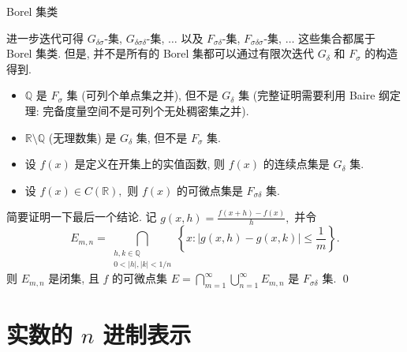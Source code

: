 \begin{frame}{Borel 集类}

进一步迭代可得 $G_{\delta\sigma}$-集, $G_{\delta\sigma\delta}$-集, $\ldots$ 以及 $F_{\sigma\delta}$-集, $F_{\sigma\delta\sigma}$-集, $\ldots$ 这些集合都属于 Borel 集类.
\pause
但是, \alert{并不是所有的 Borel 集都可以通过有限次迭代 $G_\delta$ 和 $F_\sigma$ 的构造得到.}

\pause

\begin{eg}
\begin{itemize}
\item $\mathbb{Q}$ 是 $F_\sigma$ 集 (可列个单点集之并), 但不是 $G_\delta$ 集 (完整证明需要利用 \alert{Baire 纲定理}: 完备度量空间不是可列个无处稠密集之并).
\item $\mathbb{R} \setminus \mathbb{Q}$ (无理数集) 是 $G_\delta$ 集, 但不是 $F_\sigma$ 集.
\item 设 $f(x)$ 是定义在开集上的实值函数, 则 $f(x)$ 的连续点集是 $G_\delta$ 集.
\item 设 $f(x) \in C(\mathbb{R}),$ 则 $f(x)$ 的可微点集是 $F_{\sigma\delta}$ 集.
\end{itemize}
\end{eg}

\pause

\startproof[bg=yellow, fg=red]
简要证明一下最后一个结论. 记 $g(x, h) = \frac{f(x+h) - f(x)}{h},$ 并令
\[
E_{m,n} = \bigcap_{\substack{h, k \in \mathbb{Q} \\ 0 < |h|, |k| < 1/n}} \left\{x : |g(x,h) - g(x,k)| \leqslant \frac{1}{m}\right\}.
\]
则 $E_{m,n}$ 是闭集, 且 $f$ 的可微点集 $E = \bigcap_{m=1}^\infty \bigcup_{n=1}^\infty E_{m,n}$ 是 $F_{\sigma\delta}$ 集.
\qed

\end{frame}


\section[n 进制]{实数的 $n$ 进制表示}


